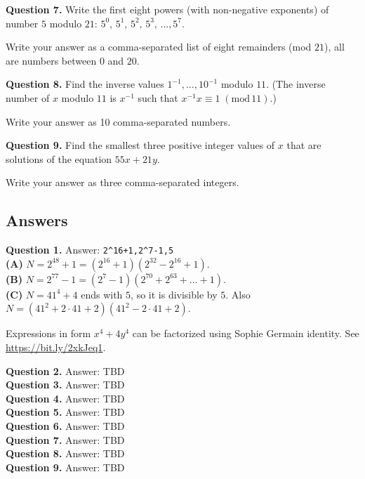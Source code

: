 \documentclass[jou]{apa6}
\begin{document}
\vspace{10pt}
{\bf Question 7.} Write the first eight powers (with non-negative exponents) 
of number $5$ modulo $21$: $5^0,\,5^1,\,5^2,\,5^3,\,\ldots,5^{7}$.

Write your answer as a comma-separated list of eight remainders (mod $21$), \textendash{} all are numbers between $0$ and $20$.


\vspace{10pt}
{\bf Question 8.} Find the inverse values $1^{-1},\ldots,10^{-1}$ modulo $11$. (The inverse number of $x$ modulo $11$ 
is $x^{-1}$ such that $x^{-1}x \equiv 1\;(\text{mod}\,11)$.)

Write your answer as 10 comma-separated numbers.


\vspace{10pt}
{\bf Question 9.} Find the smallest three positive integer values of $x$ that
are solutions of the equation $55x + 21y$. 

Write your answer as three comma-separated integers. 


\newpage 
\subsection{Answers}

\vspace{6pt}
{\bf Question 1.} Answer: {\tt 2\^{}16+1,2\^{}7-1,5}\\

{\bf (A)} $N = 2^{48} + 1 = \left( 2^{16} + 1 \right) \left( 2^{32} - 2^{16} + 1 \right)$.\\
{\bf (B)} $N = 2^{77} - 1 = \left( 2^{7} - 1 \right) \left( 2^{70} + 2^{63} + \ldots + 1 \right)$.\\
{\bf (C)} $N = 41^4 + 4$ ends with $5$, so it is divisible by $5$. 
Also $N = \left( 41^2 + 2 \cdot 41 + 2 \right) \left( 41^2 - 2 \cdot 41 + 2 \right)$. 

Expressions in form $x^4 + 4y^4$ can be factorized using Sophie Germain identity. 
See \url{https://bit.ly/2xkJeq1}.

\vspace{6pt}
{\bf Question 2.} Answer: TBD\\

\vspace{6pt}
{\bf Question 3.} Answer: TBD\\

\vspace{6pt}
{\bf Question 4.} Answer: TBD\\

\vspace{6pt}
{\bf Question 5.} Answer: TBD\\

\vspace{6pt}
{\bf Question 6.} Answer: TBD\\

\vspace{6pt}
{\bf Question 7.} Answer: TBD\\

\vspace{6pt}
{\bf Question 8.} Answer: TBD\\

\vspace{6pt}
{\bf Question 9.} Answer: TBD\\
\end{document}
